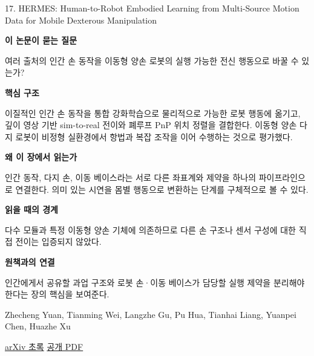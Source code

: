 \documentclass[11pt,openany]{book}
\begin{document}
\begin{termcard}{17. HERMES: Human-to-Robot Embodied Learning from Multi-Source Motion Data for Mobile Dexterous Manipulation}

\par

\medskip

{\sffamily\bfseries\color{deepblue} 이 논문이 묻는 질문}\par

여러 출처의 인간 손 동작을 이동형 양손 로봇의 실행 가능한 전신 행동으로 바꿀 수 있는가?

\smallskip

{\sffamily\bfseries\color{deepblue} 핵심 구조}\par

이질적인 인간 손 동작을 통합 강화학습으로 물리적으로 가능한 로봇 행동에 옮기고, 깊이 영상 기반 sim-to-real 전이와 폐루프 PnP 위치 정렬을 결합한다. 이동형 양손 다지 로봇이 비정형 실환경에서 항법과 복잡 조작을 이어 수행하는 것으로 평가했다.

\smallskip

{\sffamily\bfseries\color{deepblue} 왜 이 장에서 읽는가}\par

인간 동작, 다지 손, 이동 베이스라는 서로 다른 좌표계와 제약을 하나의 파이프라인으로 연결한다. 의미 있는 시연을 몸별 행동으로 변환하는 단계를 구체적으로 볼 수 있다.

\smallskip

{\sffamily\bfseries\color{coral} 읽을 때의 경계}\par

다수 모듈과 특정 이동형 양손 기체에 의존하므로 다른 손 구조나 센서 구성에 대한 직접 전이는 입증되지 않았다.

\smallskip

{\sffamily\bfseries\color{teal} 원책과의 연결}\par

인간에게서 공유할 과업 구조와 로봇 손·이동 베이스가 담당할 실행 제약을 분리해야 한다는 장의 핵심을 보여준다.

\medskip

{\footnotesize\color{muted} Zhecheng Yuan, Tianming Wei, Langzhe Gu, Pu Hua, Tianhai Liang, Yuanpei Chen, Huazhe Xu\par

\href{https://arxiv.org/abs/2508.20085}{arXiv 초록} \quad \href{https://arxiv.org/pdf/2508.20085}{공개 PDF}\par}

\end{termcard}
\end{document}
